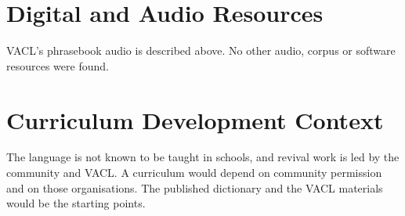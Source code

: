 \documentclass[12pt]{article}
\begin{document}
\section{Digital and Audio Resources}
VACL's phrasebook audio is described above. No other audio, corpus or software resources were found.

\section{Curriculum Development Context}
The language is not known to be taught in schools, and revival work is led by the community and VACL. A curriculum would depend on community permission and on those organisations. The published dictionary and the VACL materials would be the starting points.
\end{document}
